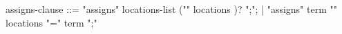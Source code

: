\begin{syntax}
assigns-clause ::= "assigns" locations-list ("\from" locations )? ";";
                 | "assigns" term "\from" locations {"=" term ";"}
\end{syntax}
